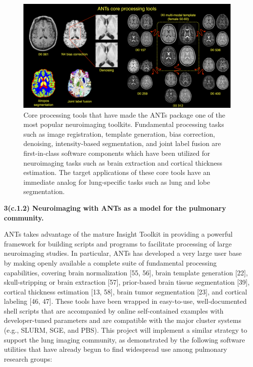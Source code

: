 \documentclass[11pt,]{article}
\begin{document}
\begin{figure}[htbp]
\centering
\includegraphics{Figs/coreANtsToolsNeuro.png}
\caption{Core processing tools that have made the ANTs package one of
the most popular neuroimaging toolkits. Fundamental processing tasks
such as image registration, template generation, bias correction,
denoising, intensity-based segmentation, and joint label fusion are
first-in-class software components which have been utilized for
neuroimaging tasks such as brain extraction and cortical thickness
estimation. The target applications of these core tools have an
immediate analog for lung-specific tasks such as lung and lobe
segmentation.}
\end{figure}

\textbf{3(c.1.2) Neuroimaging with ANTs as a model for the pulmonary
community.}

ANTs takes advantage of the mature Insight Toolkit in providing a
powerful framework for building scripts and programs to facilitate
processing of large neuroimaging studies. In particular, ANTs has
developed a very large user base by making openly available a complete
suite of fundamental processing capabilities, covering brain
normalization {[}55, 56{]}, brain template generation {[}22{]},
skull-stripping or brain extraction {[}57{]}, prior-based brain tissue
segmentation {[}39{]}, cortical thickness estimation {[}13, 58{]}, brain
tumor segmentation {[}23{]}, and cortical labeling {[}46, 47{]}. These
tools have been wrapped in easy-to-use, well-documented shell scripts
that are accompanied by online self-contained examples with
developer-tuned parameters and are compatible with the major cluster
systems (e.g., SLURM, SGE, and PBS). This project will implement a
similar strategy to support the lung imaging community, as demonstrated
by the following software utilities that have already begun to find
widespread use among pulmonary research groups:
\end{document}
